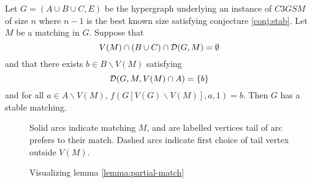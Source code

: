 \begin{lemma} \label{lemma:partial-match}Let $G=(A\cup B \cup C, E)$ be the hypergraph underlying an instance of $C3GSM$ of size $n$ where $n-1$ is the best known size satisfying conjecture \ref{conj:stab}. Let $M$ be a matching in $G$. Suppose that
$$ V(M) \cap (B \cup C) \cap \mathcal{D}(G,M) = \emptyset$$
and that there exists $b \in B\backslash V(M)$ satisfying
$$ \mathcal{D}(G, M, V(M) \cap A)  = \{b\}$$
and for all $a \in A \backslash V(M)$, $f(G[V(G)\backslash V(M)], a, 1) = b$. Then $G$ has a stable matching.
\end{lemma}
\begin{figure}[h]
\centering
{}
\caption{Visualizing lemma \ref{lemma:partial-match}}
\small
\begin{flushleft}
Solid arcs indicate matching $M$, and are labelled vertices tail of arc prefers to their match. Dashed arcs indicate first choice of tail vertex outside $V(M)$.
\end{flushleft}
\end{figure}

